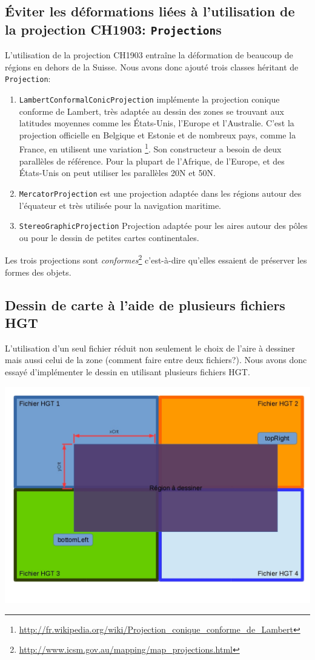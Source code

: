 \documentclass[11pt,a4paper]{article}
\begin{document}
\subsection{Éviter les déformations liées à l'utilisation de la projection CH1903: \texttt{Projection}s}
L'utilisation de la projection CH1903 entraîne la déformation de beaucoup de régions en dehors de la Suisse. Nous avons donc ajouté trois classes héritant de \texttt{Projection}:
\begin{enumerate}
    \item \texttt{LambertConformalConicProjection} implémente la projection conique conforme de Lambert, très adaptée au dessin des zones se trouvant aux latitudes moyennes comme les États-Unis, l'Europe et l'Australie. C'est la projection officielle en Belgique et Estonie et de nombreux pays, comme la France, en utilisent une variation \footnote{\url{http://fr.wikipedia.org/wiki/Projection_conique_conforme_de_Lambert}}. Son constructeur a besoin de deux parallèles de référence. Pour la plupart de l'Afrique, de l'Europe, et des États-Unis on peut utiliser les parallèles 20\degre N et 50\degre N. 
    \item \texttt{MercatorProjection} est une projection adaptée dans les régions autour des l'équateur et très utilisée pour la navigation maritime.
    \item \texttt{StereoGraphicProjection} Projection adaptée pour les aires autour des pôles ou pour le dessin de petites cartes continentales.
\end{enumerate}
Les trois projections sont \textit{conformes}\footnote{\url{http://www.icsm.gov.au/mapping/map_projections.html}} c'est-à-dire qu'elles essaient de préserver les formes des objets.

\subsection{Dessin de carte à l'aide de plusieurs fichiers HGT}
L'utilisation d'un seul fichier réduit non seulement le choix de l'aire à dessiner mais aussi celui de la zone (comment faire entre deux fichiers?). Nous avons donc essayé d'implémenter le dessin en utilisant plusieurs fichiers HGT.

\begin{center}
\includegraphics[scale=0.3]{schema4files.jpg}
\end{center}
\end{document}
